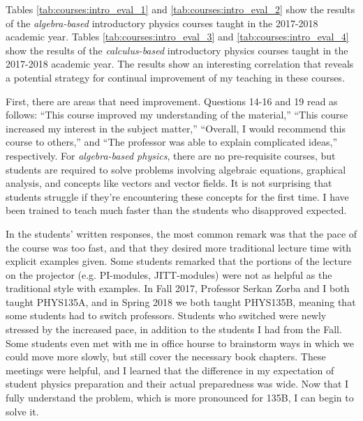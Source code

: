 \documentclass[../../main.tex]{subfiles}
\begin{document}
Tables \ref{tab:courses:intro_eval_1} and \ref{tab:courses:intro_eval_2} show the results of the \textit{algebra-based} introductory physics courses taught in the 2017-2018 academic year.  Tables \ref{tab:courses:intro_eval_3} and \ref{tab:courses:intro_eval_4} show the results of the \textit{calculus-based} introductory physics courses taught in the 2017-2018 academic year.  The results show an interesting correlation that reveals a potential strategy for continual improvement of my teaching in these courses. \\ \hspace{0.1cm}

First, there are areas that need improvement.  Questions 14-16 and 19 read as follows: ``This course improved my understanding of the material,'' ``This course increased my interest in the subject matter,'' ``Overall, I would recommend this course to others,'' and ``The professor was able to explain complicated ideas,'' respectively.  For \textit{algebra-based physics}, there are no pre-requisite courses, but students are required to solve problems involving algebraic equations, graphical analysis, and concepts like vectors and vector fields.  It is not surprising that students struggle if they're encountering these concepts for the first time.  I have been trained to teach much faster than the students who disapproved expected.  \\ \hspace{0.1cm}

In the students' written responses, the most common remark was that the pace of the course was too fast, and that they desired more traditional lecture time with explicit examples given.  Some students remarked that the portions of the lecture on the projector (e.g. PI-modules, JITT-modules) were not as helpful as the traditional style with examples.  In Fall 2017, Professor Serkan Zorba and I both taught PHYS135A, and in Spring 2018 we both taught PHYS135B, meaning that some students had to switch professors.  Students who switched were newly stressed by the increased pace, in addition to the students I had from the Fall.  Some students even met with me in office hourse to brainstorm ways in which we could move more slowly, but still cover the necessary book chapters.  These meetings were helpful, and I learned that the difference in my expectation of student physics preparation and their actual preparedness was wide.  Now that I fully understand the problem, which is more pronounced for 135B, I can begin to solve it.  \\ \hspace{0.1cm}
\end{document}
